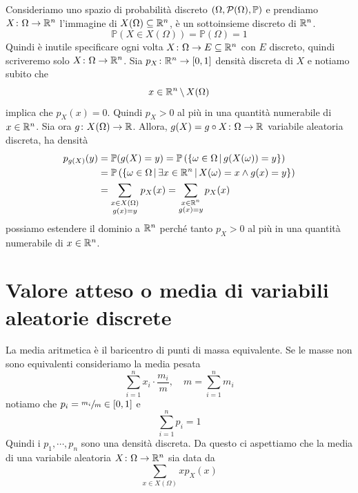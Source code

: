\documentclass[a4paper]{article}
\begin{document}
Consideriamo uno spazio di probabilità discreto \((\Omega, \mathcal P(\Omega), \mathbb P)\)
e prendiamo \(X \colon \Omega \to \mathbb{R}^n\) l'immagine di
\(X (\Omega) \subseteq \mathbb{R}^n\), è un sottoinsieme discreto di \(\mathbb{R}^n\).
\[
    \mathbb P(X \in X(\Omega)) = \mathbb P(\Omega) = 1
\]
Quindi è inutile specificare ogni volta \(X \colon \Omega \to E \subseteq \mathbb{R}^n\)
con \(E\) discreto, quindi scriveremo solo \(X \colon \Omega \to \mathbb{R}^n\).
Sia \(p_X\colon \mathbb{R}^n \to [0,1]\) densità discreta di \(X\) e notiamo subito che
\[
    x \in \mathbb{R}^n \,\backslash\, X(\Omega)
\]
implica che \(p_X(x) = 0\).
Quindi \(p_X > 0\) al più in una quantità numerabile di \(x \in \mathbb{R}^n\).
Sia ora \(g \colon X(\Omega) \to \mathbb{R}\).
Allora, \(g(X) = g \circ X \colon \Omega \to \mathbb{R}\)
variabile aleatoria discreta, ha densità
\begin{align*}
    p_{g(X)}(y) &= \mathbb P(g(X) = y)
    = \mathbb P\left(
        \{\omega \in \Omega \,|\, g(X(\omega)) = y\}
    \right) \\
    &= \mathbb P\left(
        \{
            \omega \in \Omega \,|\, \exists x \in \mathbb{R}^n
            \,|\, X(\omega)=x \land g(x) = y
        \}
    \right) \\
    &= \sum_{\substack{x \in X(\Omega) \\ g(x) = y}} p_X(x)
    = \sum_{\substack{x \in \mathbb{R}^n \\ g(x) = y}} p_X(x)
\end{align*}
possiamo estendere il dominio a \(\mathbb{R}^n\)
perché tanto \(p_X>0\) al più in una quantità numerabile di \(x \in \mathbb{R}^n\).

\pagebreak

\section{Valore atteso o media di variabili aleatorie discrete}

La media aritmetica è il baricentro di punti di massa equivalente.
Se le masse non sono equivalenti consideriamo la media pesata
\[
    \sum_{i=1}^n x_i \cdot \frac{m_i}{m}, \quad m = \sum_{i=1}^n m_i
\]
notiamo che \(p_i = \sfrac{m_i}{m} \in [0,1]\)
e \[
    \sum_{i=1}^n p_i = 1
\]
Quindi i \(p_1, \cdots, p_n\) sono una densità discreta.
Da questo ci aspettiamo che la media di una variabile aleatoria \(X \colon \Omega \to \mathbb{R}^n\)
sia data da
\[
    \sum_{x\in X(\Omega)} xp_X(x)
\]
\end{document}
